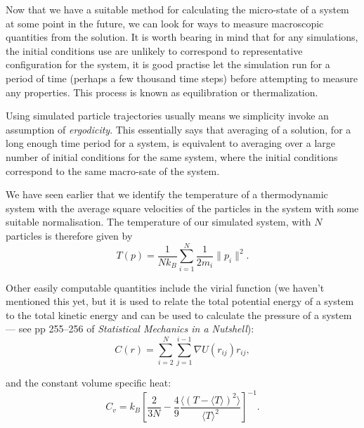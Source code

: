 \documentclass{article}
\begin{document}
Now that we have a suitable method for calculating the micro-state of a system at some point in the future, we can look for ways to measure macroscopic quantities from the solution. It is worth bearing in mind that for any simulations, the initial conditions use are unlikely to correspond to representative configuration for the system, it is good practise let the simulation run for a period of time (perhaps a few thousand time steps) before attempting to measure any properties. This process is known as equilibration or thermalization.

Using simulated particle trajectories usually means we simplicity invoke an assumption of \emph{ergodicity}. This essentially says that averaging of a solution, for a long enough time period for a system, is equivalent to averaging over a large number of initial conditions for the same system, where the initial conditions correspond to the same macro-sate of the system.

We have seen earlier that we identify the temperature of a thermodynamic system with the average square velocities of the particles in the system with some suitable normalisation. The temperature of our simulated system, with $N$ particles is therefore given by
$$
	T(p) = \frac{1}{Nk_B}\sum_{i=1}^N\frac{1}{2m_i}\|p_i\|^2.
$$

Other easily computable quantities include the virial function (we haven't mentioned this yet, but it is used to relate the total potential energy of a system to the total kinetic energy and can be used to calculate the pressure of a system --- see pp 255--256 of \emph{Statistical Mechanics in a Nutshell}):
$$
	C(r) = \sum_{i=2}^N\sum_{j=1}^{i-1}\nabla U(r_{ij})r_{ij},
$$

and the constant volume specific heat:
$$
	C_v = k_B\left[\frac{2}{3N}-\frac{4}{9}\frac{\langle(T-\langle T\rangle)^2\rangle}{\langle T\rangle^2}\right]^{-1}.
$$
\end{document}
